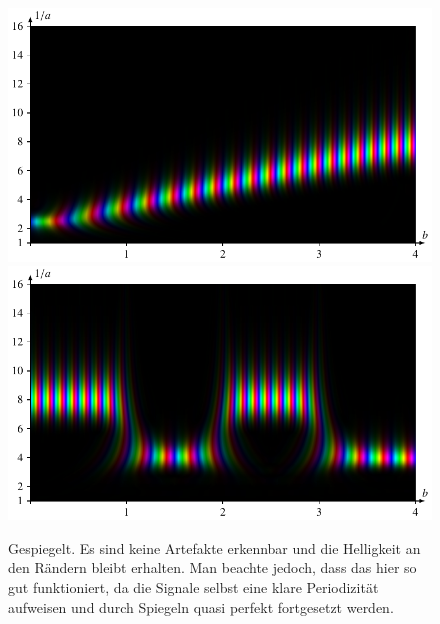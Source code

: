 \begin{figure}
	\centering
	\includegraphics[width=\linewidth, keepaspectratio]{papers/complex/images/padding_sym_sweep.pdf}
	\includegraphics[width=\linewidth, keepaspectratio]{papers/complex/images/padding_sym_square.pdf}
	\caption{Gespiegelt. Es sind keine Artefakte erkennbar und die Helligkeit an den Rändern bleibt erhalten. Man beachte jedoch, dass das hier so gut funktioniert, da die Signale selbst eine klare Periodizität aufweisen und durch Spiegeln quasi perfekt fortgesetzt werden.}
	\label{complex:padding-sym}
\end{figure}

\clearpage